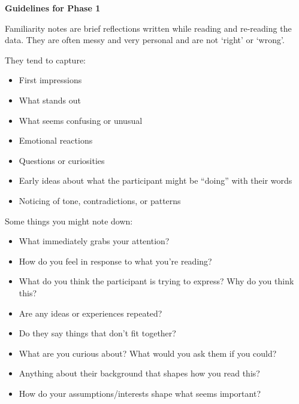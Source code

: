 \documentclass[
  english,
  letterpaper,
  DIV=11,
  numbers=noendperiod]{scrreprt}
\providecommand{\tightlist}{%
  \setlength{\itemsep}{0pt}\setlength{\parskip}{0pt}}
\begin{document}
\textbf{Guidelines for Phase 1}

Familiarity notes are brief reflections written while reading and
re-reading the data. They are often messy and very personal and are not
`right' or `wrong'.

They tend to capture:

\begin{itemize}
\tightlist
\item
  First impressions
\item
  What stands out
\item
  What seems confusing or unusual
\item
  Emotional reactions
\item
  Questions or curiosities
\item
  Early ideas about what the participant might be ``doing'' with their
  words
\item
  Noticing of tone, contradictions, or patterns
\end{itemize}

Some things you might note down:

\begin{itemize}
\tightlist
\item
  What immediately grabs your attention?
\item
  How do you feel in response to what you're reading?
\item
  What do you think the participant is trying to express? Why do you
  think this?
\item
  Are any ideas or experiences repeated?
\item
  Do they say things that don't fit together?
\item
  What are you curious about? What would you ask them if you could?
\item
  Anything about their background that shapes how you read this?
\item
  How do your assumptions/interests shape what seems important?
\end{itemize}
\end{document}

